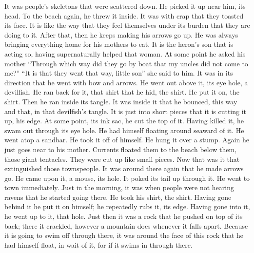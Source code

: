 \begin{pairs}
\begin{Rightside}
It was people’s skeletons that were scattered down.
He picked it up near him, its head.
To the beach again, he threw it inside.
It was with crap that they toasted its face.
It is like the way that they feel themselves under its burden that they are doing to it.
After that, then he keeps making his arrows go up.
He was always bringing everything home for his mothers to eat.
It is the heron’s son that is acting so, having supernaturally helped that woman.
At some point he asked his mother
\qqk{}“Through which way did they go by boat that my uncles did not come to me?”
\qqk{}“It is that they went that way, little son”
she said to him.
It was in its direction that he went with bow and arrows.
He went out above it, its eye hole, a devilfish.
He ran back for it, that shirt that he hid, the  shirt.
He put it on, the  shirt.
Then he ran inside its tangle.
It was inside it that he bounced, this way and that, in that devilfish’s tangle.
It is just into short pieces that it is cutting it up, his edge.
At some point, its ink sac, he cut the top of it.
Having killed it, he swam out through its eye hole.
He had himself floating around seaward of it.
He went atop a sandbar.
He took it off of himself.
He hung it over a stump.
Again he just goes near to his mother.
Currents floated them to the beach below them, those giant tentacles.
They were cut up like small pieces.
Now that was it that extinguished those townspeople.
\pend
\pstart
{}It was around there again that he made arrows go.
He came upon it, a mouse, its hole.
It poked its tail up through it.
He went to town immediately.
Just in the morning, it was when people were not hearing ravens that he started going there.
He took his shirt, the  shirt.
Having gone behind it he put it on himself;
he repeatedly rubs it, its edge.
Having gone into it, he went up to it, that hole.
Just then it was a rock that he pushed on top of its back;
there it crackled, however a mountain does whenever it falls apart.
Because it is going to swim off through there, it was around the face of this rock that he had himself float, in wait of it, for if it swims in through there.

\end{Rightside}
\end{pairs}
